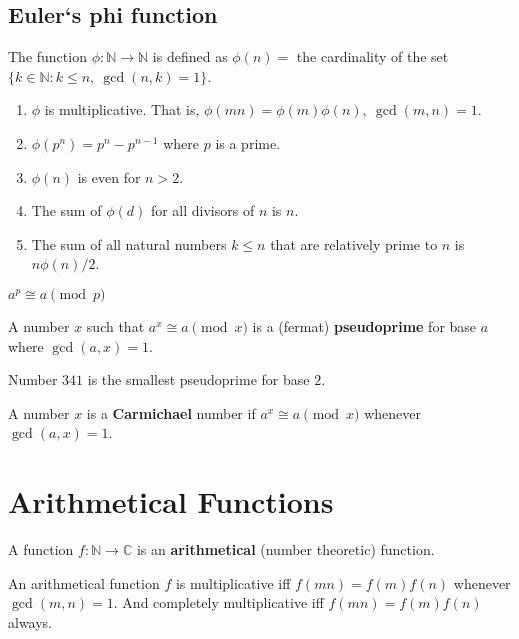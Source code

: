 \subsection{Euler`s phi function}
	The function $\phi : \mathbb{N} \to \mathbb{N}$ is defined as $\phi(n) = $ the cardinality of the set $\{k \in \mathbb{N} : k \le n,\ \gcd(n,k)=1\}$.

	\begin{enumerate}
		\item $\phi$ is multiplicative. That is, $\phi(mn) = \phi(m)\phi(n),\ \gcd(m,n)=1$.
		\item $\phi(p^n) = p^n-p^{n-1}$ where $p$ is a prime.
		\item $\phi(n)$ is even for $n > 2$.
		\item The sum of $\phi(d)$ for all divisors of $n$ is $n$.
		\item The sum of all natural numbers $k \le n$ that are relatively prime to $n$ is $n\phi(n)/2$.
	\end{enumerate}

\begin{theorem}[Fermat]
	$a^p \cong a \pmod{p}$
\end{theorem}
\begin{definition}
	A number $x$ such that $a^x \cong a \pmod{x}$ is a (fermat) \textbf{pseudoprime} for base $a$ where $\gcd(a,x) = 1$.
\end{definition}
Number $341$ is the smallest pseudoprime for base $2$.

\begin{definition}
	A number $x$ is a \textbf{Carmichael} number if $a^x \cong a \pmod{x}$ whenever $\gcd(a,x)=1$.
\end{definition}

\section{Arithmetical Functions}
\begin{definition}
	A function $f : \mathbb{N} \to \mathbb{C}$ is an \textbf{arithmetical} (number theoretic) function.
\end{definition}

\begin{definition}
	An arithmetical function $f$ is multiplicative iff $f(mn) = f(m)f(n)$ whenever $\gcd(m,n) = 1$.
	And completely multiplicative iff $f(mn) = f(m)f(n)$ always.
\end{definition}

